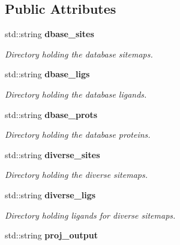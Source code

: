 \subsection*{Public Attributes}
\begin{CompactItemize}
\item 
std::string \bf{dbase\_\-sites}\label{classSimSite3D_1_1BaseParameters_4812fa282e2ba266dbfa064182b594b9}

\begin{CompactList}\small\item\em Directory holding the database sitemaps. \item\end{CompactList}\item 
std::string \bf{dbase\_\-ligs}\label{classSimSite3D_1_1BaseParameters_d6b47ad4d8d7460817551da93171de4a}

\begin{CompactList}\small\item\em Directory holding the database ligands. \item\end{CompactList}\item 
std::string \bf{dbase\_\-prots}\label{classSimSite3D_1_1BaseParameters_fbb9b1185a994a991c0e68c30fa637b6}

\begin{CompactList}\small\item\em Directory holding the database proteins. \item\end{CompactList}\item 
std::string \bf{diverse\_\-sites}\label{classSimSite3D_1_1BaseParameters_89d38ef4448211e8ae3a63988e62f158}

\begin{CompactList}\small\item\em Directory holding the diverse sitemaps. \item\end{CompactList}\item 
std::string \bf{diverse\_\-ligs}\label{classSimSite3D_1_1BaseParameters_7431a50f3120b7f9f74026ad2c10b1a2}

\begin{CompactList}\small\item\em Directory holding ligands for diverse sitemaps. \item\end{CompactList}\item 
std::string \bf{proj\_\-output}\label{classSimSite3D_1_1BaseParameters_96522745ba23c6aac7d9258d65aac545}


\end{CompactItemize}
